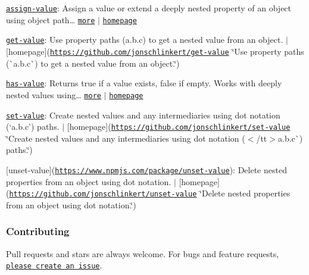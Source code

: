\begin{DoxyItemize}
\item \href{https://www.npmjs.com/package/assign-value}{\tt assign-\/value}\+: Assign a value or extend a deeply nested property of an object using object path… \href{https://github.com/jonschlinkert/assign-value}{\tt more} $\vert$ \href{https://github.com/jonschlinkert/assign-value}{\tt homepage}
\item \href{https://www.npmjs.com/package/get-value}{\tt get-\/value}\+: Use property paths ({\ttfamily a.\+b.\+c}) to get a nested value from an object. $\vert$ \mbox{[}homepage\mbox{]}(\href{https://github.com/jonschlinkert/get-value}{\tt https\+://github.\+com/jonschlinkert/get-\/value} \char`\"{}\+Use property paths (\`{}a.\+b.\+c\`{}) to get a nested value from an object.\char`\"{})
\item \href{https://www.npmjs.com/package/has-value}{\tt has-\/value}\+: Returns true if a value exists, false if empty. Works with deeply nested values using… \href{https://github.com/jonschlinkert/has-value}{\tt more} $\vert$ \href{https://github.com/jonschlinkert/has-value}{\tt homepage}
\item \href{https://www.npmjs.com/package/set-value}{\tt set-\/value}\+: Create nested values and any intermediaries using dot notation (`\textquotesingle{}a.\+b.\+c'{\ttfamily ) paths. $\vert$ \mbox{[}homepage\mbox{]}(\href{https://github.com/jonschlinkert/set-value}{\tt https\+://github.\+com/jonschlinkert/set-\/value} \char`\"{}\+Create nested values and any intermediaries using dot notation ($<$/tt$>$\textquotesingle{}a.\+b.\+c\textquotesingle{}\`{}) paths.\char`\"{})}
\item {\ttfamily \mbox{[}unset-\/value\mbox{]}(\href{https://www.npmjs.com/package/unset-value}{\tt https\+://www.\+npmjs.\+com/package/unset-\/value})\+: Delete nested properties from an object using dot notation. $\vert$ \mbox{[}homepage\mbox{]}(\href{https://github.com/jonschlinkert/unset-value}{\tt https\+://github.\+com/jonschlinkert/unset-\/value} \char`\"{}\+Delete nested properties from an object using dot notation.\char`\"{})}
\end{DoxyItemize}

{\ttfamily \subsubsection*{Contributing}}

{\ttfamily }

{\ttfamily Pull requests and stars are always welcome. For bugs and feature requests, \href{../../issues/new}{\tt please create an issue}.}


